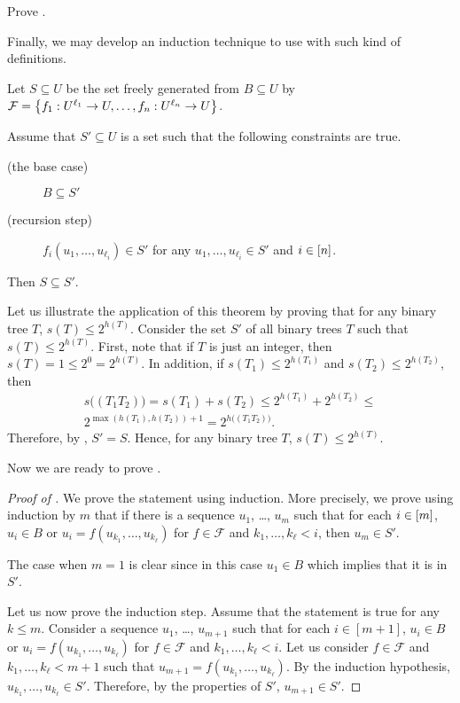 \begin{exercise}
  Prove .
\end{exercise}


Finally, we may develop an induction technique to use with such kind of
definitions.
\begin{theorem}
\label{theorem:structural-induction}
  Let $S \subseteq U$ be the set freely generated from $B \subseteq U$ by
  $\mathcal{F} = \set{f_1 : U^{\ell_1} \to U, \dots, f_n : U^{\ell_n} \to U}$.

  Assume that $S' \subseteq U$ is a set such that the following constraints are
  true.
  \begin{description}
    \item [(the base case)] $B \subseteq S'$
    \item[(recursion step)] $f_i(u_1, \dots, u_{\ell_i}) \in S'$ for any
      $u_1, \dots, u_{\ell_i} \in S'$ and $i \in [{n}]$.
  \end{description}
  Then $S \subseteq S'$.
\end{theorem}

Let us illustrate the application of this theorem by proving that for any
binary tree $T$, $s(T) \le 2^{h(T)}$.
Consider the set $S'$ of all binary trees $T$ such that $s(T) \le 2^{h(T)}$.
First, note that if $T$ is just an integer, then $s(T) = 1 \le 2^0 = 2^{h(T)}$.
In addition, if $s(T_1) \le 2^{h(T_1)}$ and $s(T_2) \le 2^{h(T_2)}$, then
\begin{multline*}
  s\big( (T_1 T_2) \big) = s(T_1) + s(T_2) \le 2^{h(T_1)} + 2^{h(T_2)} \le \\
  2^{\max(h(T_1), h(T_2)) + 1} = 2^{h\big( (T_1 T_2) \big)}.
\end{multline*}
Therefore, by , $S' = S$. Hence, for any
binary tree $T$, $s(T) \le 2^{h(T)}$.

Now we are ready to prove .
\begin{proof}[Proof of ]
  We prove the statement using induction. More precisely, we prove using
  induction by $m$ that if there is a sequence
  $u_1$, \dots, $u_m$ such that
  for each $i \in [{m}]$, $u_i \in B$ or $u_i = f(u_{k_1}, \dots, u_{k_\ell})$
  for $f \in \mathcal{F}$ and $k_1, \dots, k_\ell < i$, then $u_m \in S'$.

  The case when $m = 1$ is clear since in this case $u_1 \in B$ which implies
  that it is in $S'$.

  Let us now prove the induction step. Assume that the statement is true for any
  $k \le m$. Consider a sequence $u_1$, \dots, $u_{m + 1}$ such that
  for each $i \in [m + 1]$,
  $u_i \in B$ or $u_i = f(u_{k_1}, \dots, u_{k_\ell})$
  for $f \in \mathcal{F}$ and $k_1, \dots, k_\ell < i$. Let us consider
  $f \in \mathcal{F}$ and $k_1, \dots, k_\ell < m + 1$ such that
  $u_{m + 1} = f(u_{k_1}, \dots, u_{k_\ell})$. By the induction hypothesis,
  $u_{k_1}, \dots, u_{k_\ell} \in S'$. Therefore, by the properties of $S'$,
  $u_{m + 1} \in S'$.
\end{proof}

